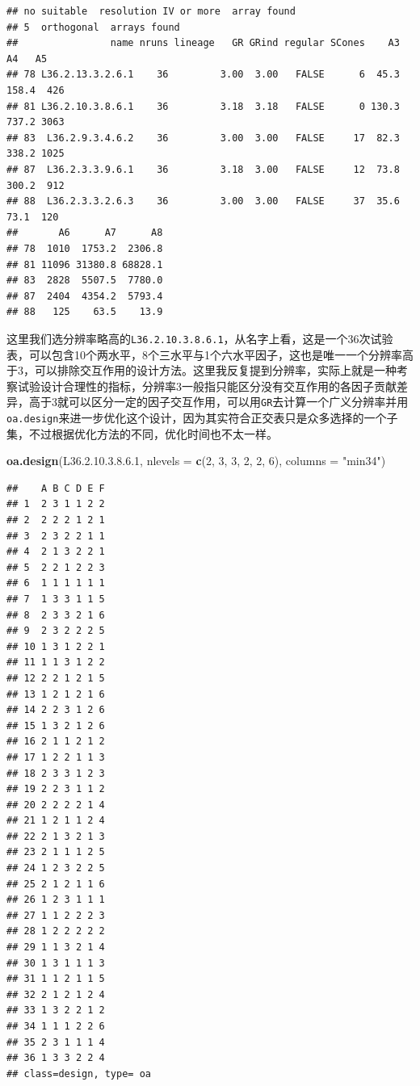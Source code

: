 \documentclass[]{tufte-book}
\newenvironment{Shaded}{}{}
\newcommand{\DataTypeTok}[1]{\textcolor[rgb]{0.56,0.13,0.00}{#1}}
\newcommand{\DecValTok}[1]{\textcolor[rgb]{0.25,0.63,0.44}{#1}}
\newcommand{\FloatTok}[1]{\textcolor[rgb]{0.25,0.63,0.44}{#1}}
\newcommand{\KeywordTok}[1]{\textcolor[rgb]{0.00,0.44,0.13}{\textbf{#1}}}
\newcommand{\NormalTok}[1]{#1}
\newcommand{\StringTok}[1]{\textcolor[rgb]{0.25,0.44,0.63}{#1}}
\begin{document}
\begin{verbatim}
## no suitable  resolution IV or more  array found
## 5  orthogonal  arrays found
##                name nruns lineage   GR GRind regular SCones    A3    A4   A5
## 78 L36.2.13.3.2.6.1    36         3.00  3.00   FALSE      6  45.3 158.4  426
## 81 L36.2.10.3.8.6.1    36         3.18  3.18   FALSE      0 130.3 737.2 3063
## 83  L36.2.9.3.4.6.2    36         3.00  3.00   FALSE     17  82.3 338.2 1025
## 87  L36.2.3.3.9.6.1    36         3.18  3.00   FALSE     12  73.8 300.2  912
## 88  L36.2.3.3.2.6.3    36         3.00  3.00   FALSE     37  35.6  73.1  120
##       A6      A7      A8
## 78  1010  1753.2  2306.8
## 81 11096 31380.8 68828.1
## 83  2828  5507.5  7780.0
## 87  2404  4354.2  5793.4
## 88   125    63.5    13.9
\end{verbatim}

这里我们选分辨率略高的\texttt{L36.2.10.3.8.6.1}，从名字上看，这是一个36次试验表，可以包含10个两水平，8个三水平与1个六水平因子，这也是唯一一个分辨率高于3，可以排除交互作用的设计方法。这里我反复提到分辨率，实际上就是一种考察试验设计合理性的指标，分辨率3一般指只能区分没有交互作用的各因子贡献差异，高于3就可以区分一定的因子交互作用，可以用\texttt{GR}去计算一个广义分辨率并用\texttt{oa.design}来进一步优化这个设计，因为其实符合正交表只是众多选择的一个子集，不过根据优化方法的不同，优化时间也不太一样。

\begin{Shaded}
\begin{Highlighting}[]
\KeywordTok{oa.design}\NormalTok{(L36.}\DecValTok{2}\NormalTok{.}\DecValTok{10}\NormalTok{.}\DecValTok{3}\NormalTok{.}\DecValTok{8}\NormalTok{.}\FloatTok{6.1}\NormalTok{, }\DataTypeTok{nlevels =} \KeywordTok{c}\NormalTok{(}\DecValTok{2}\NormalTok{, }\DecValTok{3}\NormalTok{, }\DecValTok{3}\NormalTok{, }\DecValTok{2}\NormalTok{, }\DecValTok{2}\NormalTok{, }\DecValTok{6}\NormalTok{), }\DataTypeTok{columns =} \StringTok{"min34"}\NormalTok{)}
\end{Highlighting}
\end{Shaded}

\begin{verbatim}
##    A B C D E F
## 1  2 3 1 1 2 2
## 2  2 2 2 1 2 1
## 3  2 3 2 2 1 1
## 4  2 1 3 2 2 1
## 5  2 2 1 2 2 3
## 6  1 1 1 1 1 1
## 7  1 3 3 1 1 5
## 8  2 3 3 2 1 6
## 9  2 3 2 2 2 5
## 10 1 3 1 2 2 1
## 11 1 1 3 1 2 2
## 12 2 2 1 2 1 5
## 13 1 2 1 2 1 6
## 14 2 2 3 1 2 6
## 15 1 3 2 1 2 6
## 16 2 1 1 2 1 2
## 17 1 2 2 1 1 3
## 18 2 3 3 1 2 3
## 19 2 2 3 1 1 2
## 20 2 2 2 2 1 4
## 21 1 2 1 1 2 4
## 22 2 1 3 2 1 3
## 23 2 1 1 1 2 5
## 24 1 2 3 2 2 5
## 25 2 1 2 1 1 6
## 26 1 2 3 1 1 1
## 27 1 1 2 2 2 3
## 28 1 2 2 2 2 2
## 29 1 1 3 2 1 4
## 30 1 3 1 1 1 3
## 31 1 1 2 1 1 5
## 32 2 1 2 1 2 4
## 33 1 3 2 2 1 2
## 34 1 1 1 2 2 6
## 35 2 3 1 1 1 4
## 36 1 3 3 2 2 4
## class=design, type= oa
\end{verbatim}
\end{document}
